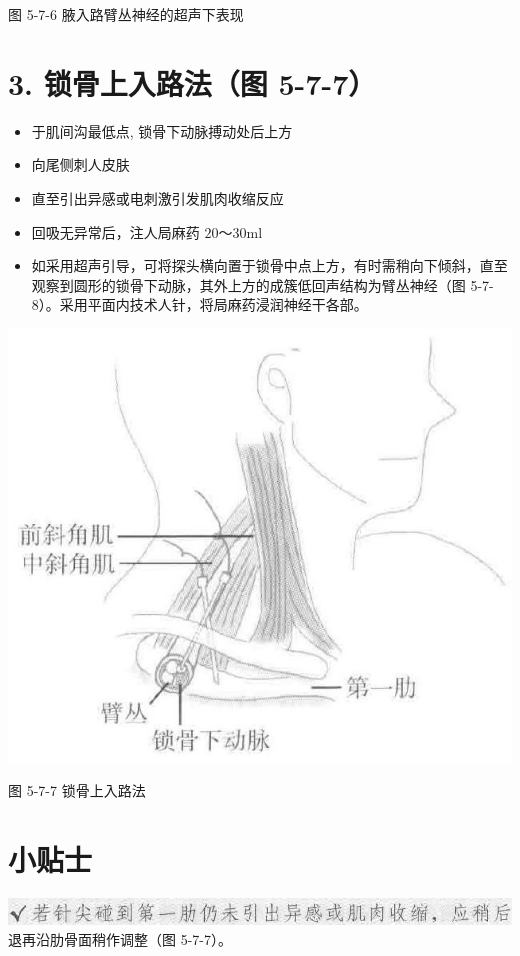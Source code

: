 \documentclass[10pt]{article}
\begin{document}
图 5-7-6 腋入路臂丛神经的超声下表现

\section*{3. 锁骨上入路法（图 5-7-7）}
\begin{itemize}
  \item 于肌间沟最低点, 锁骨下动脉搏动处后上方
  \item 向尾侧刺人皮肤
  \item 直至引出异感或电刺激引发肌肉收缩反应
  \item 回吸无异常后，注人局麻药 $20 ～ 30 \mathrm{ml}$
  \item 如采用超声引导，可将探头横向置于锁骨中点上方，有时需稍向下倾斜，直至观察到圆形的锁骨下动脉，其外上方的成簇低回声结构为臂丛神经（图 5-7-8）。采用平面内技术人针，将局麻药浸润神经干各部。
\end{itemize}

\begin{center}
\includegraphics[max width=\textwidth]{2024_07_05_645bb794a4d4f32ee0c8g-321(1)}
\end{center}

图 5-7-7 锁骨上入路法

\section*{小贴士}
\includegraphics[max width=\textwidth, center]{2024_07_05_645bb794a4d4f32ee0c8g-321}\\
退再沿肋骨面稍作调整（图 5-7-7）。
\end{document}

